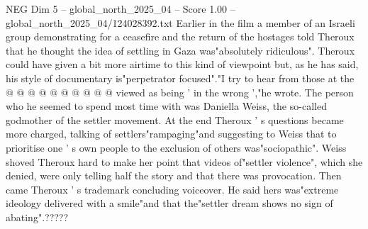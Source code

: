 \begin{textsample}{NEG Dim 5 – global\_north\_2025\_04 – Score 1.00 – global\_north\_2025\_04/124028392.txt}
Earlier in the film a member of an Israeli group demonstrating for a ceasefire and the return of the hostages told Theroux that he thought the idea of settling in Gaza was"absolutely ridiculous".
Theroux could have given a bit more airtime to this kind of viewpoint but, as he has said, his style of documentary is"perpetrator focused"."I try to hear from those at the @ @ @ @ @ @ @ @ @ @ viewed as being ' in the wrong ',"he wrote.
The person who he seemed to spend most time with was Daniella Weiss, the so-called godmother of the settler movement.
At the end Theroux ' s questions became more charged, talking of settlers"rampaging"and suggesting to Weiss that to prioritise one ' s own people to the exclusion of others was"sociopathic".
Weiss shoved Theroux hard to make her point that videos of"settler violence", which she denied, were only telling half the story and that there was provocation.
Then came Theroux ' s trademark concluding voiceover.
He said hers was"extreme ideology delivered with a smile"and that the"settler dream shows no sign of abating".?????

\end{textsample}
